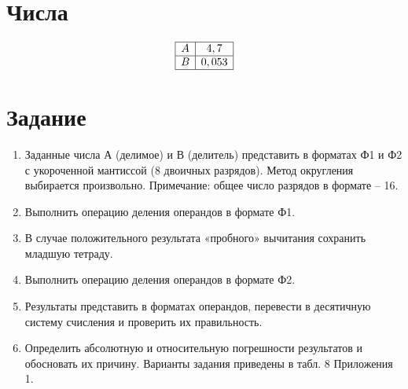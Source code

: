\documentclass{article}
\begin{document}
\itmo[
       variant=111,
       labn=8,
       worktype=Домашняя работа,
       discipline=Дискретная математика,
       group=P3115,
       student=Владимир Мацюк,
       teacher=Поляков Владимир Иванович,
       logo=../../../lib/img/itmo.png
]

\newcommand{\car}{\multicolumn{1}{c@{\hspace*{\tabcolsep}\makebox[0pt]{\curvearrowleft}}}{}}
\newcommand{\rcar}{\multicolumn{1}{c@{\hspace*{\tabcolsep}\makebox[0pt]{\curvearrowright}}}{}}
\newcommand{\ncar}{\multicolumn{1}{c@{\hspace*{\tabcolsep}\makebox[0pt]{}}}{}}
\newcommand{\SPACE}{\multicolumn{12}{c}{}}
\newcommand{\INT}{\multicolumn{5}{c}{\MM{Интерпретации}}}
\newcommand{\PLUS}{\multirow{2}{*}{+}}
\newcommand{\MINUS}{\multirow{2}{*}{-}}
\newcommand{\SIGN}{\multicolumn{2}{c}{\MM{Знаковая}}}
\newcommand{\USIGN}{\multicolumn{2}{c}{\MM{Беззнаковая}}}

\section{Числа}
$$
       \begin{array}{|c|c|}
              \hline
              A & 4,7 \\\hline
              B & 0,053 \\\hline
       \end{array}
$$
\section{Задание}

\begin{enumerate}
       \item Заданные числа А (делимое) и В (делитель) представить в форматах Ф1 и Ф2 с укороченной мантиссой (8 двоичных разрядов). Метод округления выбирается произвольно.
       Примечание: общее число разрядов в формате – 16.
       \item Выполнить операцию деления операндов в формате Ф1.
       \item В случае положительного результата «пробного» вычитания сохранить младшую тетраду.
       \item Выполнить операцию деления операндов в формате Ф2.
       \item Результаты представить в форматах операндов, перевести в десятичную систему счисления и проверить их правильность.
       \item Определить абсолютную и относительную погрешности результатов и обосновать их причину.
       Варианты задания приведены в табл. 8 Приложения 1.
       
             
\end{enumerate}
\end{document}
